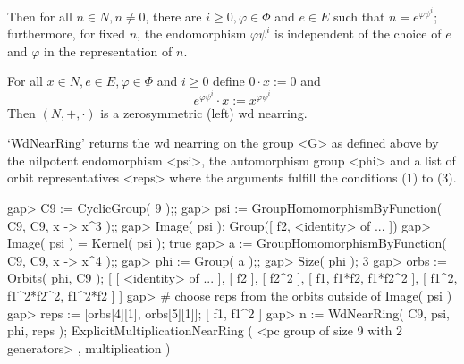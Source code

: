 Then for all $n\in N, n\neq 0$, there are $i\geq 0 ,\varphi\in\Phi$ and
$e\in E$ such that $n = e^{\varphi\psi^i}$; furthermore, for fixed $n$, the
endomorphism $\varphi\psi^i$ is independent of the choice of $e$ and
$\varphi$ in the representation of $n$. 
 
For all $x\in N, e\in E,\varphi\in\Phi$ and $i\geq 0$ define $0\cdot x := 0$
and
    $$ e^{\varphi\psi^i}\cdot x := x^{\varphi\psi^i} $$
Then $(N,+,\cdot)$ is a zerosymmetric (left) wd nearring. 

`WdNearRing' returns the wd nearring on the group <G> as defined above
by the nilpotent endomorphism <psi>, the automorphism group <phi> and
a list of orbit representatives <reps> where the arguments fulfill the
conditions (1) to (3).

\beginexample
    gap> C9 := CyclicGroup( 9 );;
    gap> psi := GroupHomomorphismByFunction( C9, C9, x -> x^3 );;
    gap> Image( psi );
    Group([ f2, <identity> of ... ])
    gap> Image( psi ) = Kernel( psi );
    true
    gap> a := GroupHomomorphismByFunction( C9, C9, x -> x^4 );;
    gap> phi := Group( a );;
    gap> Size( phi );
    3
    gap> orbs := Orbits( phi, C9 );
    [ [ <identity> of ... ], [ f2 ], [ f2^2 ], [ f1, f1*f2, f1*f2^2 ],
      [ f1^2, f1^2*f2^2, f1^2*f2 ] ]
    gap> # choose reps from the orbits outside of Image( psi )
    gap> reps := [orbs[4][1], orbs[5][1]];
    [ f1, f1^2 ]
    gap> n := WdNearRing( C9, psi, phi, reps );
    ExplicitMultiplicationNearRing ( <pc group of size 9 with
    2 generators> , multiplication )
\endexample



